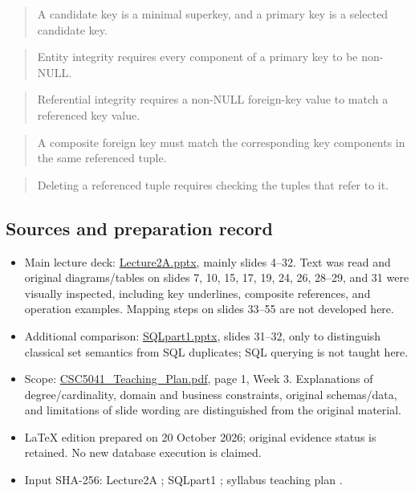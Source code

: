 \begin{quote}
A candidate key is a minimal superkey, and a primary key is a selected candidate key.
\end{quote}

\begin{quote}
Entity integrity requires every component of a primary key to be non-NULL.
\end{quote}

\begin{quote}
Referential integrity requires a non-NULL foreign-key value to match a referenced key value.
\end{quote}

\begin{quote}
A composite foreign key must match the corresponding key components in the same referenced tuple.
\end{quote}

\begin{quote}
Deleting a referenced tuple requires checking the tuples that refer to it.
\end{quote}

\subsection{Sources and preparation record}\label{03_relational_model_and_integrity_en-sources-and-preparation-record}

\begin{itemize}
\tightlist
\item
  Main lecture deck: \href{../../../slides/Lecture2A.pptx}{Lecture2A.pptx}, mainly slides 4--32. Text was read and original diagrams/tables on slides 7, 10, 15, 17, 19, 24, 26, 28--29, and 31 were visually inspected, including key underlines, composite references, and operation examples. Mapping steps on slides 33--55 are not developed here.
\item
  Additional comparison: \href{../../../slides/SQLpart1.pptx}{SQLpart1.pptx}, slides 31--32, only to distinguish classical set semantics from SQL duplicates; SQL querying is not taught here.
\item
  Scope: \href{../../../syllabus/CSC5041_Teaching_Plan.pdf}{CSC5041\_Teaching\_Plan.pdf}, page 1, Week 3. Explanations of degree/cardinality, domain and business constraints, original schemas/data, and limitations of slide wording are distinguished from the original material.
\item
  LaTeX edition prepared on 20 October 2026; original evidence status is retained. No new database execution is claimed.
\item
  Input SHA-256: Lecture2A \texttt{}; SQLpart1 \texttt{}; syllabus teaching plan \texttt{}.
\end{itemize}
